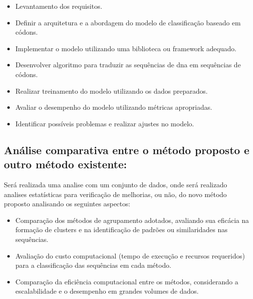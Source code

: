 \begin{itemize}
  \item Levantamento dos requisitos.
  \item Definir a arquitetura e a abordagem do modelo de classificação baseado em códons.
  \item Implementar o modelo utilizando uma biblioteca ou framework adequado.
  \item Desenvolver algoritmo para traduzir as sequências de \gls{dna} em sequências de códons.
  \item Realizar treinamento do modelo utilizando os dados preparados.
  \item Avaliar o desempenho do modelo utilizando métricas apropriadas.
  \item Identificar possíveis problemas e realizar ajustes no modelo.
\end{itemize}

\subsection{Análise comparativa entre o método proposto e outro método existente:}

Será realizada uma analise com um conjunto de dados, onde será realizado analises estatísticas para verificação de melhorias, ou não, do novo método proposto analisando os seguintes aspectos:
\begin{itemize}
  \item Comparação dos métodos de agrupamento adotados, avaliando sua eficácia na formação de clusters e na identificação de padrões ou similaridades nas sequências.
  \item Avaliação do custo computacional (tempo de execução e recursos requeridos) para a classificação das sequências em cada método.
  \item Comparação da eficiência computacional entre os métodos, considerando a escalabilidade e o desempenho em grandes volumes de dados.
\end{itemize}

